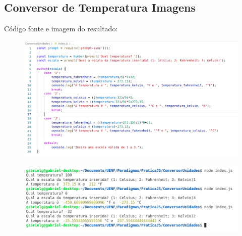  \subsection{Conversor de Temperatura Imagens}
 Código fonte e imagem do resultado:
\begin{figure}[h]
	\centering
	\includegraphics[width=1\linewidth]{Pictures/ConversorTempCode}
	\caption{}
	\label{fig:conversortempcode}
\end{figure}
\begin{figure}[h]
	\centering
	\includegraphics[width=0.9\linewidth]{Pictures/ConversorTempResultado}
	\caption{}
	\label{fig:conversortempresultado}
\end{figure}

	
	
	


	